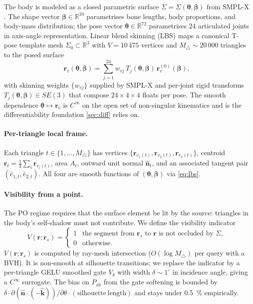 \documentclass[11pt,a4paper]{article}
\theoremstyle{definition}
\newcommand{\khat}{\hat{\bm{k}}}
\newcommand{\nhat}{\hat{\bm{n}}}
\newcommand{\rr}{\mathbf{r}}
\newcommand{\Reals}{\mathbb{R}}
\newcommand{\thetab}{\bm{\theta}}
\newcommand{\betab}{\bm{\beta}}
\newcommand{\Pabs}{P_{\mathrm{ab}}}
\begin{document}
The body is modeled as a closed parametric surface
$\Sigma=\Sigma(\thetab,\betab)$ from SMPL-X
\cite{Pavlakos2019}.  The shape vector
$\betab\in\Reals^{10}$ parametrises bone lengths, body
proportions, and body-mass distribution; the pose vector
$\thetab\in\Reals^{72}$ parametrises 24 articulated joints in axis-angle
representation.  Linear blend skinning (LBS) maps a canonical
T-pose template mesh
$\Sigma_0\subset\Reals^3$ with $V=10\,475$ vertices and
$M_\triangle\sim 20\,000$ triangles to the posed surface
\begin{equation}\label{eq:lbs}
  \rr_v(\thetab,\betab)
  =\sum_{j=1}^{24} w_{vj}\,T_j(\thetab,\betab)\,
   \rr_v^{(0)}(\betab),
\end{equation}
with skinning weights $\{w_{vj}\}$ supplied by SMPL-X and per-joint
rigid transforms $T_j(\thetab,\betab)\in SE(3)$ that compose
$24\times 4\times 4$ floats per pose.  The smooth dependence
$\thetab\mapsto\rr_v$ is $C^\infty$ on the open set of
non-singular kinematics and is the differentiability foundation
\cref{sec:diff} relies on.

\paragraph{Per-triangle local frame.}  Each triangle
$t\in\{1,\ldots,M_\triangle\}$ has vertices
$\{\rr_{v_1(t)},\rr_{v_2(t)},\rr_{v_3(t)}\}$, centroid
$\rr_t=\tfrac{1}{3}\sum_i\rr_{v_i(t)}$, area $A_t$, outward unit
normal $\nhat_t$, and an associated tangent pair
$(\hat e_{1,t},\hat e_{2,t})$.  All four are smooth functions of
$(\thetab,\betab)$ via \cref{eq:lbs}.

\paragraph{Visibility from a point.}  The PO regime requires that
the surface element be lit by the source: triangles in the body's
self-shadow must not contribute.  We define the visibility
indicator
\begin{equation}\label{eq:vis-from}
  V(\rr;\rr_s)=\begin{cases}
    1 & \text{the segment from $\rr_s$ to $\rr$ is not occluded by $\Sigma$},\\
    0 & \text{otherwise.}
  \end{cases}
\end{equation}
$V(\rr;\rr_s)$ is computed by ray-mesh intersection
($O(\log M_\triangle)$ per query with a BVH).  It is non-smooth at
silhouette transitions; we replace the indicator by a per-triangle
GELU smoothed gate $V_\delta$ with width $\delta\sim 1^\circ$ in
incidence angle, giving a $C^\infty$ surrogate.  The bias on
$\Pabs$ from the gate softening is bounded by $\delta\cdot
\partial(\nhat\cdot(-\khat))/\partial\theta\cdot
\mathrm{(silhouette\ length)}$ and stays under \SI{0.5}{\percent}
empirically.
\end{document}
